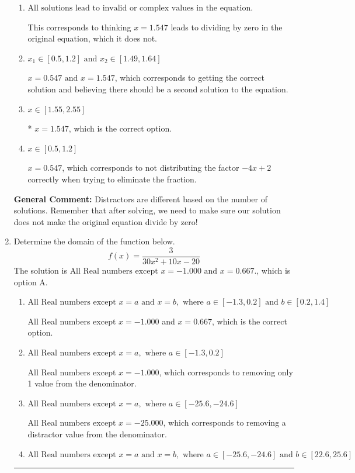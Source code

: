 \documentclass{extbook}[14pt]
\newcommand{\litem}[1]{\item #1

\rule{\textwidth}{0.4pt}}
\begin{document}
\begin{enumerate}
{\begin{enumerate}[label=\Alph*.]
$x = 1.547 \text{ and } x = 1.875$, which corresponds to getting the correct solution and believing there should be a second solution to the equation.
\item \( \text{All solutions lead to invalid or complex values in the equation.} \)

This corresponds to thinking $x = 1.547$ leads to dividing by zero in the original equation, which it does not.
\item \( x_1 \in [0.5, 1.2] \text{ and } x_2 \in [1.49,1.64] \)

$x = 0.547 \text{ and } x = 1.547$, which corresponds to getting the correct solution and believing there should be a second solution to the equation.
\item \( x \in [1.55,2.55] \)

* $x = 1.547$, which is the correct option.
\item \( x \in [0.5,1.2] \)

$x = 0.547$, which corresponds to not distributing the factor $-4x + 2$ correctly when trying to eliminate the fraction.
\end{enumerate}

\textbf{General Comment:} Distractors are different based on the number of solutions. Remember that after solving, we need to make sure our solution does not make the original equation divide by zero!
}
\litem{
Determine the domain of the function below.
\[ f(x) = \frac{3}{30x^{2} +10 x -20} \]The solution is \( \text{All Real numbers except } x = -1.000 \text{ and } x = 0.667. \), which is option A.\begin{enumerate}[label=\Alph*.]
\item \( \text{All Real numbers except } x = a \text{ and } x = b, \text{ where } a \in [-1.3, 0.2] \text{ and } b \in [0.2, 1.4] \)

All Real numbers except $x = -1.000$ and $x = 0.667$, which is the correct option.
\item \( \text{All Real numbers except } x = a, \text{ where } a \in [-1.3, 0.2] \)

All Real numbers except $x = -1.000$, which corresponds to removing only 1 value from the denominator.
\item \( \text{All Real numbers except } x = a, \text{ where } a \in [-25.6, -24.6] \)

All Real numbers except $x = -25.000$, which corresponds to removing a distractor value from the denominator.
\item \( \text{All Real numbers except } x = a \text{ and } x = b, \text{ where } a \in [-25.6, -24.6] \text{ and } b \in [22.6, 25.6] \)


\end{enumerate}}
\end{enumerate}
\end{document}
